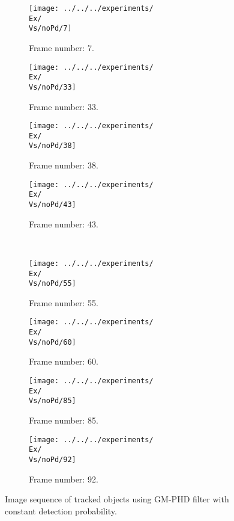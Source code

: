 \begin{figure}[H]
    \centering
    \begin{subfigure}{0.23\textwidth}
        \centering
        \texttt{[image: ../../../experiments/\\Ex/\\Vs/noPd/7]}
        \caption{Frame number: 7.}
        \label{fig:\Ex-\Vs-\Set:01}
    \end{subfigure}
    \begin{subfigure}{0.23\textwidth}
        \centering
        \texttt{[image: ../../../experiments/\\Ex/\\Vs/noPd/33]}
        \caption{Frame number: 33.}
        \label{fig:\Ex-\Vs-\Set:02}
    \end{subfigure}
    \begin{subfigure}{0.23\textwidth}
        \centering
        \texttt{[image: ../../../experiments/\\Ex/\\Vs/noPd/38]}
        \caption{Frame number: 38.}
        \label{fig:\Ex-\Vs-\Set:03}
    \end{subfigure}
    \begin{subfigure}{0.23\textwidth}
        \centering
        \texttt{[image: ../../../experiments/\\Ex/\\Vs/noPd/43]}
        \caption{Frame number: 43.}
        \label{fig:\Ex-\Vs-\Set:04}
    \end{subfigure}
    \\
    \begin{subfigure}{0.23\textwidth}
        \centering
        \texttt{[image: ../../../experiments/\\Ex/\\Vs/noPd/55]}
        \caption{Frame number: 55.}
        \label{fig:\Ex-\Vs-\Set:05}
    \end{subfigure}
    \begin{subfigure}{0.23\textwidth}
        \centering
        \texttt{[image: ../../../experiments/\\Ex/\\Vs/noPd/60]}
        \caption{Frame number: 60.}
        \label{fig:\Ex-\Vs-\Set:06}
    \end{subfigure}
    \begin{subfigure}{0.23\textwidth}
        \centering
        \texttt{[image: ../../../experiments/\\Ex/\\Vs/noPd/85]}
        \caption{Frame number: 85.}
        \label{fig:\Ex-\Vs-\Set:07}
    \end{subfigure}
    \begin{subfigure}{0.23\textwidth}
        \centering
        \texttt{[image: ../../../experiments/\\Ex/\\Vs/noPd/92]}
        \caption{Frame number: 92.}
        \label{fig:\Ex-\Vs-\Set:08}
    \end{subfigure}
    \caption{Image sequence of tracked objects using GM-PHD filter with constant detection probability.}
    \label{fig:\Ex-\Vs-\Set}
\end{figure}




